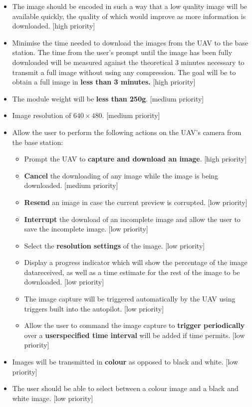 \begin{itemize}
	\item The image should be encoded in such a way that a low quality image will be available quickly, the quality of which would improve as more information is downloaded. [high priority]
	\item Minimise the time needed to download the images from the UAV to the base station. The time from the user’s prompt until the image has been fully downloaded will be measured against the theoretical 3 minutes necessary to transmit a full image without using any compression. The goal will be to obtain a full image in \textbf{less than 3 minutes.} [high priority]
	\item The module weight will be \textbf{less than 250g}. [medium priority]
	\item Image resolution of \textbf{$640\times480$}. [medium priority]
	\item Allow the user to perform the following actions on the UAV’s camera from the base station:
	\begin{itemize}
		\item Prompt the UAV to \textbf{capture and download an image}. [high priority]
		\item \textbf{Cancel} the downloading of any image while the image is being downloaded. [medium priority]
		\item \textbf{Resend} an image in case the current preview is corrupted. [low priority]
		\item \textbf{Interrupt} the download of an incomplete image and allow the user to save the incomplete image. [low priority]
		\item Select the \textbf{resolution settings} of the image. [low priority]
		\item Display a progress indicator which will show the percentage of the image datareceived, as well as a time estimate for the rest of the image to be downloaded. [low priority]
		\item The image capture will be triggered automatically by the UAV using triggers built into the autopilot. [low priority]
		\item Allow the user to command the image capture to \textbf{trigger periodically} over a \textbf{userspecified time interval} will be added if time permits. [low priority]
	\end{itemize}
	\item Images will be transmitted in \textbf{colour} as opposed to black and white. [low priority]
	\item The user should be able to select between a colour image and a black and white image. [low priority]
\end{itemize}


